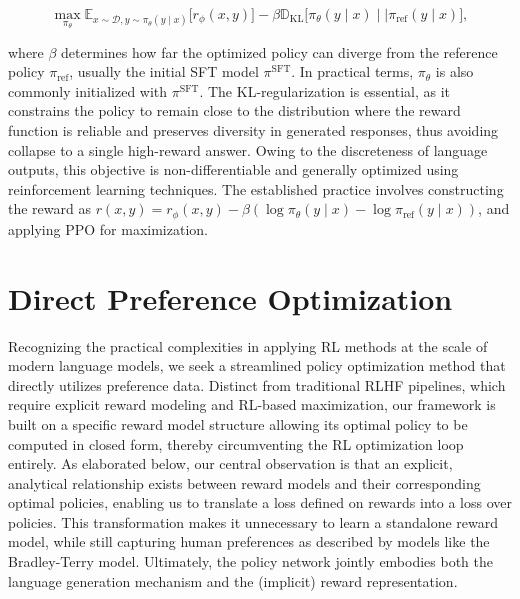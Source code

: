 \begin{equation}\label{eq:RL}
\max_{\pi_{\theta}}  \mathbb{E}_{x\sim \mathcal{D}, y\sim \pi_{\theta}(y \mid x)}\bigl[r_{\phi}(x, y)\bigr] - \beta\mathbb{D}_{\textrm{KL}}\bigl[\pi_{\theta}(y\mid x)\mid \mid \pi_\text{ref}(y\mid x)\bigr],
\end{equation}

where $\beta$ determines how far the optimized policy can diverge from the reference policy $\pi_\text{ref}$, usually the initial SFT model $\pi^\text{SFT}$. In practical terms, $\pi_\theta$ is also commonly initialized with $\pi^\text{SFT}$. The KL-regularization is essential, as it constrains the policy to remain close to the distribution where the reward function is reliable and preserves diversity in generated responses, thus avoiding collapse to a single high-reward answer. Owing to the discreteness of language outputs, this objective is non-differentiable and generally optimized using reinforcement learning techniques. The established practice \citep{ziegler2020finetuning, stiennon2022learning, bai2022training, ouyang2022training} involves constructing the reward as ${r(x, y) = r_{\phi}(x, y) -\beta (\log \pi_{\theta}(y\mid x) - \log \pi_\text{ref}(y\mid x))}$, and applying PPO \cite{schulman2017proximal} for maximization.

\section{Direct Preference Optimization}\label{sec:DPO}

Recognizing the practical complexities in applying RL methods at the scale of modern language models, we seek a streamlined policy optimization method that directly utilizes preference data. Distinct from traditional RLHF pipelines, which require explicit reward modeling and RL-based maximization, our framework is built on a specific reward model structure allowing its optimal policy to be computed in closed form, thereby circumventing the RL optimization loop entirely. As elaborated below, our central observation is that an explicit, analytical relationship exists between reward models and their corresponding optimal policies, enabling us to translate a loss defined on rewards into a loss over policies. This transformation makes it unnecessary to learn a standalone reward model, while still capturing human preferences as described by models like the Bradley-Terry model. Ultimately, the policy network jointly embodies both the language generation mechanism and the (implicit) reward representation.

